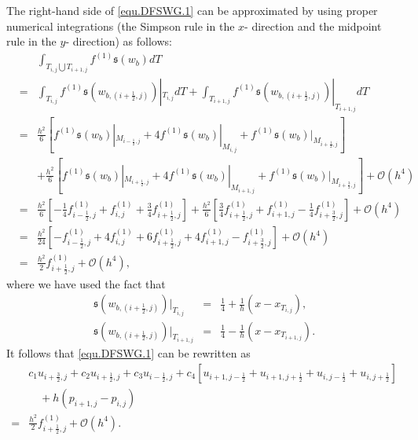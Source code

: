 \documentclass[final,leqno]{siamltex704}
\def\S{{\mathfrak s}}
\def\O{{\mathcal O}}
\begin{document}
The right-hand side of \eqref{equ.DFSWG.1} can be approximated by using proper numerical integrations (the Simpson rule in the $x$- direction and the midpoint rule in the $y$- direction) as follows:
\begin{eqnarray}
&&\int_{T_{i,j}\bigcup T_{i+1,j}} f^{(1)} \S(w_b)dT \nonumber\\ &=&\int_{T_{i,j}}f^{(1)}\S(w_{b,(i+\frac{1}{2},j)})|_{T_{i,j}} dT+ \int_{T_{i+1,j}}f^{(1)}\S(w_{b,(i+\frac{1}{2},j)})|_{T_{i+1,j}}dT \nonumber\\
&=&\frac{h^2}{6}[f^{(1)} \S(w_{b})|_{M_{i-\frac{1}{2},j}} + 4f^{(1)}\S(w_{b})|_{M_{i,j}} + f^{(1)}\S(w_{b})|_{M_{i+\frac{1}{2},j}}]\nonumber\\
&&+\frac{h^2}{6}[f^{(1)}\S(w_{b})|_{M_{i+\frac{1}{2},j}} + 4f^{(1)}\S(w_{b})|_{M_{i+1,j}} + f^{(1)}\S(w_{b})|_{M_{i+\frac{3}{2},j}}]+\O(h^4) \label{equ.Simpson}\\
&=& \frac{h^2}{6}[-\frac{1}{4}f^{(1)}_{i-\frac{1}{2},j} + f^{(1)}_{i,j} + \frac{3}{4}f^{(1)}_{i+\frac{1}{2},j}]+\frac{h^2}{6}[\frac{3}{4}
f^{(1)}_{i+\frac{1}{2},j} + f^{(1)}_{i+1,j} - \frac{1}{4}f^{(1)}_{i+\frac{3}{2},j}]+\O(h^4)\nonumber\\
&=&\frac{h^2}{24}[-f^{(1)}_{i-\frac{1}{2},j} + 4f^{(1)}_{i,j} +6f^{(1)}_{i+\frac{1}{2},j} +4f^{(1)}_{i+1,j}-f^{(1)}_{i+\frac{3}{2},j}] +\O(h^4) \nonumber \\%
&= &\frac{h^2}{2}f^{(1)}_{i+\frac{1}{2},j} + \O(h^4), \nonumber %
\end{eqnarray}
where we have used the fact that
\begin{eqnarray*}
\S(w_{b,(i+\frac{1}{2},j)})|_{T_{i,j}} &=&\frac{1}{4} + \frac{1}{h} (x-x_{T_{i,j}}),\\
\S(w_{b,(i+\frac{1}{2},j)})|_{T_{i+1,j}} &=&\frac{1}{4} - \frac{1}{h}(x-x_{T_{i+1,j}}).
\end{eqnarray*}
It follows that \eqref{equ.DFSWG.1} can be rewritten as
\begin{equation}\label{equ.DFSWG.1.new}
\begin{split}
& c_1u_{i+\frac{3}{2},j}+ c_2u_{i+\frac{1}{2},j}+ c_3u_{i-\frac{1}{2},j} +c_4[u_{i+1,j-\frac{1}{2}}+u_{i+1,j+\frac{1}{2}}+u_{i,j-\frac{1}{2}}
+u_{i,j+\frac{1}{2}}] \\
& \quad +h(p_{i+1,j}-p_{i,j})\\
 = & \frac{h^2}{2}f^{(1)}_{i+\frac{1}{2},j} + \O(h^4).
\end{split}
\end{equation}
\end{document}
